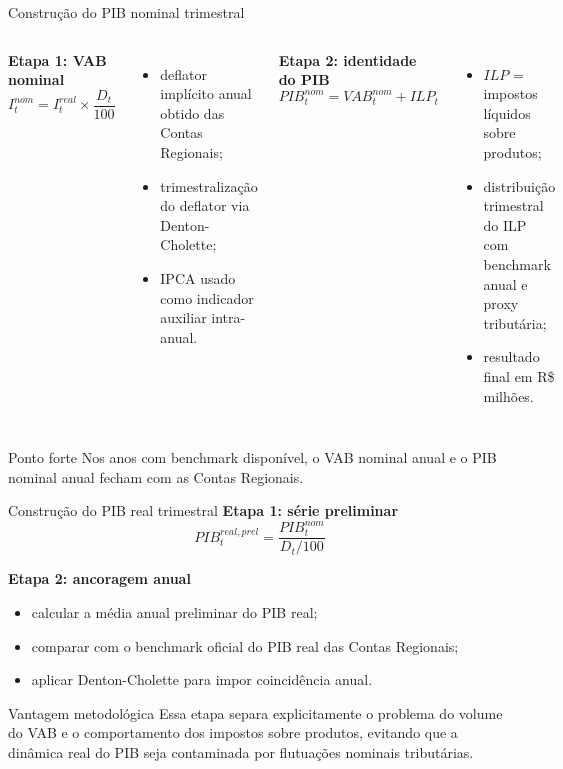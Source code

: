 \documentclass[aspectratio=169,11pt]{beamer}
\begin{document}
\begin{frame}{Construção do PIB nominal trimestral}
\begin{columns}[T]
\textbf{Etapa 1: VAB nominal}
\[
I_t^{nom} = I_t^{real} \times \frac{D_t}{100}
\]

\begin{itemize}
  \item deflator implícito anual obtido das Contas Regionais;
  \item trimestralização do deflator via Denton-Cholette;
  \item IPCA usado como indicador auxiliar intra-anual.
\end{itemize}

\textbf{Etapa 2: identidade do PIB}
\[
PIB_t^{nom} = VAB_t^{nom} + ILP_t
\]

\begin{itemize}
  \item \(ILP\) = impostos líquidos sobre produtos;
  \item distribuição trimestral do ILP com benchmark anual e proxy tributária;
  \item resultado final em R\$ milhões.
\end{itemize}
\end{columns}

\vspace{0.2cm}
\begin{block}{Ponto forte}
Nos anos com benchmark disponível, o VAB nominal anual e o PIB nominal anual fecham com as Contas Regionais.
\end{block}
\end{frame}

\begin{frame}{Construção do PIB real trimestral}
\textbf{Etapa 1: série preliminar}
\[
PIB_t^{real,prel} = \frac{PIB_t^{nom}}{D_t/100}
\]

\textbf{Etapa 2: ancoragem anual}
\begin{itemize}
  \item calcular a média anual preliminar do PIB real;
  \item comparar com o benchmark oficial do PIB real das Contas Regionais;
  \item aplicar Denton-Cholette para impor coincidência anual.
\end{itemize}

\begin{alertblock}{Vantagem metodológica}
Essa etapa separa explicitamente o problema do volume do VAB e o comportamento dos impostos sobre produtos, evitando que a dinâmica real do PIB seja contaminada por flutuações nominais tributárias.
\end{alertblock}
\end{frame}
\end{document}
